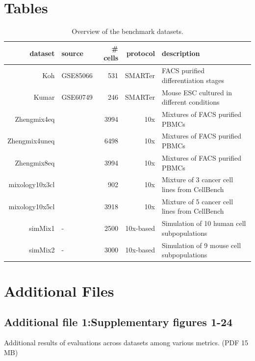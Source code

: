\documentclass{bmcart}
\begin{document}
\begin{backmatter}

\section*{Tables}

\begin{table}[h!]
\caption{Overview of the benchmark datasets.}
\label{tab:table1}
\begin{tabular}{rlrrl}
  \hline
dataset & source & # cells & protocol & description \\ 
  \hline
Koh & GSE85066 & 531 & SMARTer & FACS purified differentiation stages \\ 
  Kumar & GSE60749 & 246 & SMARTer & Mouse ESC cultured in different conditions \\ 
  Zhengmix4eq & \cite{duoClustering2018} & 3994 & 10x & Mixtures of FACS purified PBMCs \\ 
  Zhengmix4uneq & \cite{duoClustering2018} & 6498 & 10x & Mixtures of FACS purified PBMCs \\ 
  Zhengmix8eq & \cite{duoClustering2018} & 3994 & 10x & Mixtures of FACS purified PBMCs \\ 
  mixology10x3cl & \cite{tianMixology2018} & 902 & 10x & Mixture of 3  cancer cell lines from CellBench \\ 
  mixology10x5cl & \cite{tianMixology2018} & 3918 & 10x & Mixture of 5 cancer cell lines from CellBench \\ 
  simMix1 & - & 2500 & 10x-based & Simulation of 10 human cell subpopulations \\
  simMix2 & - & 3000 & 10x-based & Simulation of 9 mouse cell subpopulations \\
   \hline
\end{tabular}
\end{table}



\section*{Additional Files}
  \subsection*{\textbf{Additional file 1:Supplementary figures 1-24}}
  Additional results of evaluations across datasets among various metrics. (PDF 15 MB)

\end{backmatter}
\end{document}
